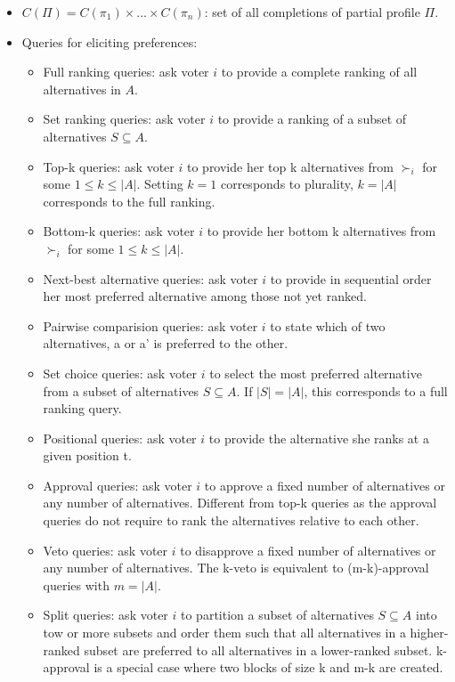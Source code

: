 \documentclass[12pt,a4paper]{article}
\begin{document}
\begin{itemize}
    \item $C(\Pi) = C(\pi_1) \times ... \times C(\pi_n)$: set of all completions of partial profile $\Pi$.
    \item Queries for eliciting preferences:
    \begin{itemize}
        \item Full ranking queries: ask voter $i$ to provide a complete ranking of all alternatives in $A$.
        \item Set ranking queries: ask voter $i$ to provide a ranking of a subset of alternatives $S \subseteq A$.
        \item Top-k queries: ask voter $i$ to provide her top k alternatives from $\succ_i$ for some $1 \leq k \leq |A|$. Setting $k=1$ corresponds to plurality, $k=|A|$ corresponds to the full ranking.
        \item Bottom-k queries: ask voter $i$ to provide her bottom k alternatives from $\succ_i$ for some $1 \leq k \leq |A|$.
        \item Next-best alternative queries: ask voter $i$ to provide in sequential order her most preferred alternative among those not yet ranked.
        \item Pairwise comparision queries: ask voter $i$ to state which of two alternatives, a or a' is preferred to the other.
        \item Set choice queries: ask voter $i$ to select the most preferred alternative from a subset of alternatives $S \subseteq A$. If $|S|=|A|$, this corresponds to a full ranking query.
        \item Positional queries: ask voter $i$ to provide the alternative she ranks at a given position t.
        \item Approval queries: ask voter $i$ to approve a fixed number of alternatives or any number of alternatives. Different from top-k queries as the approval queries do not require to rank the alternatives relative to each other.
        \item Veto queries: ask voter $i$ to disapprove a fixed number of alternatives or any number of alternatives. The k-veto is equivalent to (m-k)-approval queries with $m=|A|$.
        \item Split queries: ask voter $i$ to partition a subset of alternatives $S \subseteq A$ into tow or more subsets and order them such that all alternatives in a higher-ranked subset are preferred to all alternatives in a lower-ranked subset. k-approval is a special case where two blocks of size k and m-k are created.
    \end{itemize}
\end{itemize}
\end{document}
